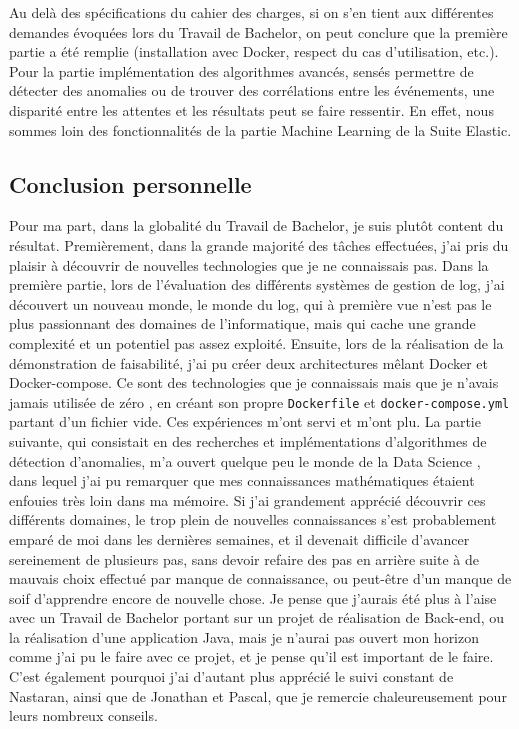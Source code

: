 \documentclass[paper=a4, fontsize=11pt]{scrartcl}
\begin{document}
Au delà des spécifications du cahier des charges, si on s'en tient aux différentes demandes évoquées lors du Travail de Bachelor, on peut conclure que la première partie a été remplie (installation avec Docker, respect du cas d'utilisation, etc.). Pour la partie implémentation des algorithmes avancés, sensés permettre de détecter des anomalies ou de trouver des corrélations entre les événements, une disparité entre les attentes et les résultats peut se faire ressentir. En effet, nous sommes loin des fonctionnalités de la partie Machine Learning de la Suite Elastic.

\subsection{Conclusion personnelle}

Pour ma part, dans la globalité du Travail de Bachelor, je suis plutôt content du résultat. Premièrement, dans la grande majorité des tâches effectuées, j'ai pris du plaisir à découvrir de nouvelles technologies que je ne connaissais pas. Dans la première partie, lors de l'évaluation des différents systèmes de gestion de log, j'ai découvert un nouveau monde, le monde du log, qui à première vue n'est pas le plus passionnant des domaines de l'informatique, mais qui cache une grande complexité et un potentiel pas assez exploité. Ensuite, lors de la réalisation de la démonstration de faisabilité, j'ai pu créer deux architectures mêlant Docker et Docker-compose. Ce sont des technologies que je connaissais mais que je n'avais jamais utilisée \og de zéro \fg, en créant son propre \verb,Dockerfile, et \verb,docker-compose.yml, partant d'un fichier vide. Ces expériences m'ont servi et m'ont plu. La partie suivante, qui consistait en des recherches et implémentations d'algorithmes de détection d'anomalies, m'a ouvert quelque peu le monde de la \og Data Science \fg, dans lequel j'ai pu remarquer que mes connaissances mathématiques étaient enfouies très loin dans ma mémoire.\newline
Si j'ai grandement apprécié découvrir ces différents domaines, le trop plein de nouvelles connaissances s'est probablement emparé de moi dans les dernières semaines, et il devenait difficile d'avancer sereinement de plusieurs pas, sans devoir refaire des pas en arrière suite à de mauvais choix effectué par manque de connaissance, ou peut-être d'un manque de soif d'apprendre encore de nouvelle chose. \newline
Je pense que j'aurais été plus à l'aise avec un Travail de Bachelor portant sur un projet de réalisation de Back-end, ou la réalisation d'une application Java, mais je n'aurai pas ouvert mon horizon comme j'ai pu le faire avec ce projet, et je pense qu'il est important de le faire. C'est également pourquoi j'ai d'autant plus apprécié le suivi constant de Nastaran, ainsi que de Jonathan et Pascal, que je remercie chaleureusement pour leurs nombreux conseils.\newline
\end{document}
